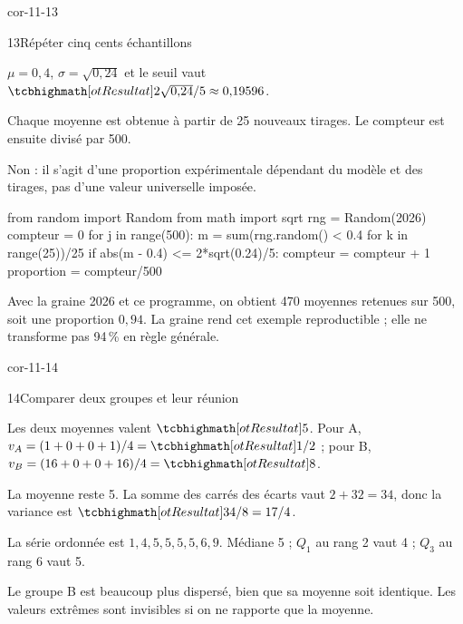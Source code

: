 \begin{blocLivre}{cor-11-13}
\begin{corrige}{13}{Répéter cinq cents échantillons}
\begin{questions}
\item $\mu=0{,}4$, $\sigma=\sqrt{0{,}24}$ et le seuil vaut $\res{2\sqrt{0{,}24}/5\approx0{,}19596}$.
\item Chaque moyenne est obtenue à partir de 25 nouveaux tirages. Le compteur est ensuite divisé par 500.
\item Non : il s’agit d’une proportion expérimentale dépendant du modèle et des tirages, pas d’une valeur universelle imposée.
\end{questions}
\begin{python}
from random import Random
from math import sqrt
rng = Random(2026)
compteur = 0
for j in range(500):
    m = sum(rng.random() < 0.4 for k in range(25))/25
    if abs(m - 0.4) <= 2*sqrt(0.24)/5:
        compteur = compteur + 1
proportion = compteur/500
\end{python}

Avec la graine 2026 et ce programme, on obtient 470 moyennes retenues sur 500, soit une proportion $0{,}94$. La graine rend cet exemple reproductible ; elle ne transforme pas 94\,\% en règle générale.

\end{corrige}
\end{blocLivre}
\begin{blocLivre}{cor-11-14}
\begin{corrige}{14}{Comparer deux groupes et leur réunion}
\begin{questions}
\item Les deux moyennes valent $\res{5}$. Pour A, $v_A=(1+0+0+1)/4=\res{1/2}$ ; pour B, $v_B=(16+0+0+16)/4=\res{8}$.
\item La moyenne reste 5. La somme des carrés des écarts vaut $2+32=34$, donc la variance est $\res{34/8=17/4}$.
\item La série ordonnée est $1,4,5,5,5,5,6,9$. Médiane 5 ; $Q_1$ au rang 2 vaut 4 ; $Q_3$ au rang 6 vaut 5.
\item Le groupe B est beaucoup plus dispersé, bien que sa moyenne soit identique. Les valeurs extrêmes sont invisibles si on ne rapporte que la moyenne.
\end{questions}
\label{figlivre-r11-14-groupes-cor}

\end{corrige}
\end{blocLivre}
